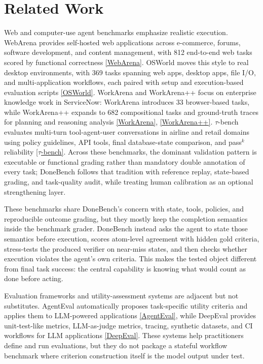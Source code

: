 \section{Related Work}
Web and computer-use agent benchmarks emphasize realistic execution. WebArena provides self-hosted web applications across e-commerce, forums, software development, and content management, with 812 end-to-end web tasks scored by functional correctness \href{https://arxiv.org/abs/2307.13854}{[WebArena]}. OSWorld moves this style to real desktop environments, with 369 tasks spanning web apps, desktop apps, file I/O, and multi-application workflows, each paired with setup and execution-based evaluation scripts \href{https://arxiv.org/abs/2404.07972}{[OSWorld]}. WorkArena and WorkArena++ focus on enterprise knowledge work in ServiceNow: WorkArena introduces 33 browser-based tasks, while WorkArena++ expands to 682 compositional tasks and ground-truth traces for planning and reasoning analysis \href{https://arxiv.org/abs/2403.07718}{[WorkArena]}, \href{https://arxiv.org/abs/2407.05291}{[WorkArena++]}. $\tau$-bench evaluates multi-turn tool-agent-user conversations in airline and retail domains using policy guidelines, API tools, final database-state comparison, and pass$^k$ reliability \href{https://arxiv.org/abs/2406.12045}{[$\tau$-bench]}. Across these benchmarks, the dominant validation pattern is executable or functional grading rather than mandatory double annotation of every task; DoneBench follows that tradition with reference replay, state-based grading, and task-quality audit, while treating human calibration as an optional strengthening layer.

These benchmarks share DoneBench's concern with state, tools, policies, and reproducible outcome grading, but they mostly keep the completion semantics inside the benchmark grader. DoneBench instead asks the agent to state those semantics before execution, scores atom-level agreement with hidden gold criteria, stress-tests the produced verifier on near-miss states, and then checks whether execution violates the agent's own criteria. This makes the tested object different from final task success: the central capability is knowing what would count as done before acting.

Evaluation frameworks and utility-assessment systems are adjacent but not substitutes. AgentEval automatically proposes task-specific utility criteria and applies them to LLM-powered applications \href{https://arxiv.org/abs/2402.09015}{[AgentEval]}, while DeepEval provides unit-test-like metrics, LLM-as-judge metrics, tracing, synthetic datasets, and CI workflows for LLM applications \href{https://deepeval.com/docs/introduction}{[DeepEval]}. These systems help practitioners define and run evaluations, but they do not package a stateful workflow benchmark where criterion construction itself is the model output under test.

